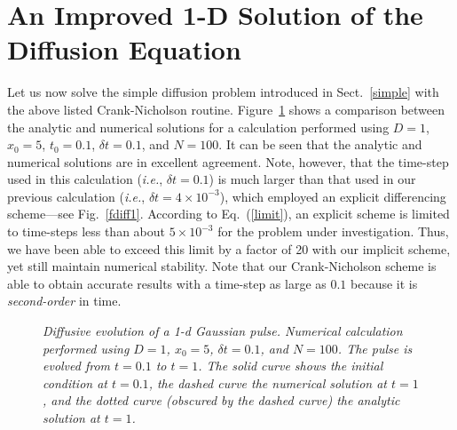 \section{An Improved 1-D Solution of the Diffusion Equation}
Let us now solve the simple diffusion problem introduced in Sect.~\ref{simple} with the above listed
Crank-Nicholson routine. Figure~\ref{fdiff3} 
shows a comparison between the analytic and numerical solutions for
a calculation performed using $D=1$, $x_0=5$,  $t_0=0.1$, $\delta t = 0.1$, and $N=100$.
It can be seen that the analytic and numerical solutions are in excellent agreement.
Note, however, that the time-step  used in this calculation ({\em i.e.}, $\delta t = 0.1$) is much larger
than that used in our previous calculation ({\em i.e.}, $\delta t = 4\times
10^{-3}$), which employed an explicit differencing
scheme---see Fig.~\ref{fdiff1}. According to Eq.~(\ref{limit}), an explicit
 scheme is limited to time-steps less than about $5\times 10^{-3}$ for the problem under
investigation.
Thus, we have been able to exceed this limit by a factor of  20 with our
implicit scheme, yet still maintain numerical stability. 
Note that our Crank-Nicholson scheme is able to
obtain accurate results with a time-step as large as $0.1$ because it is
{\em second-order} in time. 

\begin{figure}
\epsfysize=3in
\centerline{}
\caption{\em Diffusive evolution of a 1-d Gaussian  pulse.
Numerical  calculation performed using
$D=1$, $x_0=5$, $\delta t = 0.1$, and $N=100$. The pulse is evolved from $t=0.1$ to $t=1$. The
solid curve shows the initial condition at $t=0.1$, the dashed curve  the numerical solution
at $t=1$, and the dotted curve (obscured by the dashed curve)  the analytic solution at $t=1$. }\label{fdiff3}
\end{figure}

